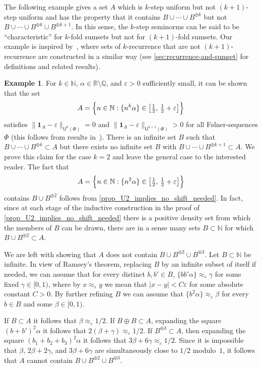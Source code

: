 \documentclass[10pt,dvipsnames]{article}
\theoremstyle{definition}
\newtheorem{example}[theorem]{Example}
\theoremstyle{plain}
\newcommand{\R}{\mathbb{R}}
\newcommand{\Q}{\mathbb{Q}}
\newcommand{\N}{\mathbb{N}}
\newcommand{\Folner}{F\o{}lner}
\newcommand{\one}{\boldsymbol{1}}
\newcommand{\un}[2]{{\mathsf{U}^{#1}(#2)}}
\begin{document}
The following example gives a set $A$ which is $k$-step uniform but not $(k+1)$-step uniform and has the property that it contains $B\cup \cdots\cup B^{\oplus k}$ but not $B\cup \cdots\cup B^{\oplus k} \cup B^{\oplus k+1}$.
In this sense, the $k$-step seminorms can be said to be ``characteristic'' for $k$-fold sumsets but not for $(k+1)$-fold sumsets.
Our example is inspired by~\cite{FLW-2006},  where sets of $k$-recurrence that are not $(k+1)$-recurrence are constructed in a similar way (see \cref{sec:recurrence-and-sumset} for definitions and related results).


\begin{example}\label{example_nilbohrset}
For $k\in\N$, $\alpha\in\R\setminus\Q$, and $\varepsilon>0$ sufficiently small, it can be shown that the set
\[
A=\Bigl\{n\in\N: \{n^k\alpha\}\in \bigl[\tfrac{1}{2},\, \tfrac{1}{2}+\varepsilon\bigr]\Bigr\}
\]
satisfies $\|\one_A-\varepsilon\|_{\un{k}{\Phi}}=0$ and $\|\one_A-\varepsilon\|_{\un{k+1}{\Phi}}>0$ for all \Folner{}-sequences $\Phi$ (this follows from results in~\cite{FLW-2006}).
There is an infinite set $B$ such that $B\cup \cdots\cup B^{\oplus k}\subset A$ but there exists no infinite set $B$ with $B\cup \cdots\cup B^{\oplus k+1}\subset A$.
We prove this claim for the case $k=2$ and leave the general case to the interested reader.
The fact that 
\[
A=\Bigl\{n\in\N: \{n^2\alpha\}\in \bigl[\tfrac{1}{2},\, \tfrac{1}{2}+\varepsilon\bigr]\Bigr\}
\]
contains $B\cup B^{\oplus 2}$ follows from \cref{prop_U2_implies_no_shift_needed}.
In fact, since at each stage of the inductive construction in the proof of \cref{prop_U2_implies_no_shift_needed} there is a positive density set from which the members of $B$ can be drawn, there are in a sense many sets $B \subset \N$ for which $B\cup B^{\oplus 2}\subset A$.

We are left with showing that $A$ does not contain $B\cup B^{\oplus 2}\cup B^{\oplus 3}$.
Let $B\subset\N$ be infinite.
In view of Ramsey's theorem, replacing $B$ by an infinite subset of itself if needed, we can assume that for every distinct $b,b'\in B$, $\{bb'\alpha\}\approx_\varepsilon \gamma$ for some fixed $\gamma\in[0,1)$, where by $x \approx_\varepsilon y$ we mean that $|x-y| < C\varepsilon$ for some absolute constant $C > 0$.
By further refining $B$ we can assume that $\{b^2\alpha\} \approx_\varepsilon \beta$ for every $b\in B$ and some $\beta\in[0,1)$.

If $B\subset A$ it follows that $\beta\approx_\varepsilon1/2$.
If $B\oplus B\subset A$, expanding the square $(b+b')^2\alpha$ it follows that $2(\beta+\gamma)\approx_\varepsilon1/2$.
If $B^{\oplus3}\subset A$, then expanding the square $(b_1+b_2+b_3)^2\alpha$ it follows that $3\beta+6\gamma\approx_\varepsilon1/2$.
Since it is impossible that $\beta$, $2\beta+2\gamma$, and $3\beta+6\gamma$ are simultaneously close to $1/2$ modulo~$1$, it follows that $A$ cannot contain $B\cup B^{\oplus 2}\cup B^{\oplus 3}$.
\end{example}
\end{document}

